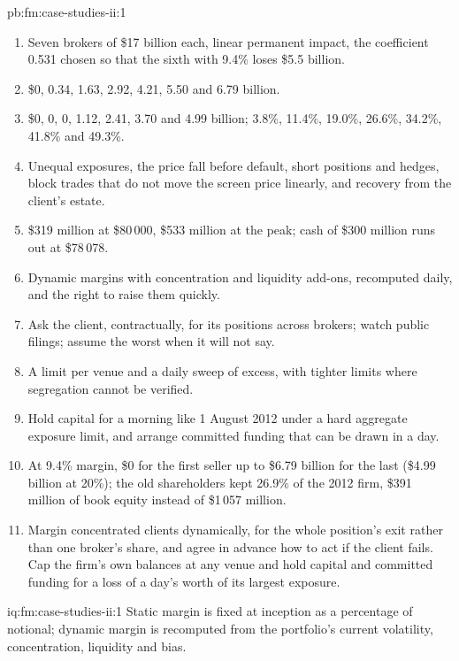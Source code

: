 \begin{solution}{pb:fm:case-studies-ii:1}
\begin{enumerate}
\item Seven brokers of \$17 billion each, linear permanent impact, the coefficient 0.531 chosen so that the sixth with 9.4\% loses \$5.5 billion.
\item \$0, 0.34, 1.63, 2.92, 4.21, 5.50 and 6.79 billion.
\item \$0, 0, 0, 1.12, 2.41, 3.70 and 4.99 billion; 3.8\%, 11.4\%, 19.0\%, 26.6\%, 34.2\%, 41.8\% and 49.3\%.
\item Unequal exposures, the price fall before default, short positions and hedges, block trades that do not move the screen price linearly, and
recovery from the client's estate.
\item \$319 million at \$80\,000, \$533 million at the peak; cash of \$300 million runs out at \$78\,078.
\item Dynamic margins with concentration and liquidity add-ons, recomputed daily, and the right to raise them quickly.
\item Ask the client, contractually, for its positions across brokers; watch public filings; assume the worst when it will not say.
\item A limit per venue and a daily sweep of excess, with tighter limits where segregation cannot be verified.
\item Hold capital for a morning like 1 August 2012 under a hard aggregate exposure limit, and arrange committed funding that can be drawn in a day.
\item At 9.4\% margin, \$0 for the first seller up to \$6.79 billion for the last (\$4.99 billion at 20\%); the old shareholders kept 26.9\% of the
2012 firm, \$391 million of book equity instead of \$1\,057 million.
\item Margin concentrated clients dynamically, for the whole position's exit rather than one broker's share, and agree in advance how to act if the
client fails. Cap the firm's own balances at any venue and hold capital and committed funding for a loss of a day's worth of its largest exposure.
\end{enumerate}
\end{solution}

\begin{solution}{iq:fm:case-studies-ii:1}
Static margin is fixed at inception as a percentage of notional; dynamic margin is recomputed from the portfolio's current volatility,
concentration, liquidity and bias.
\end{solution}

